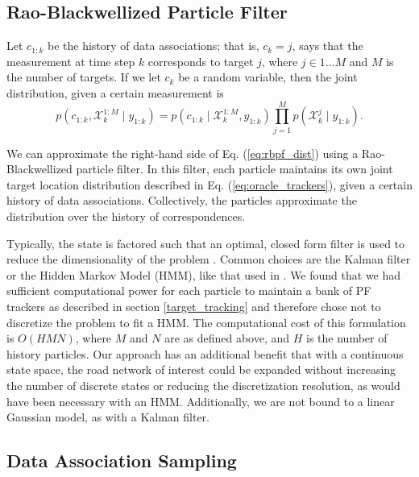\documentclass[letterpaper, 10 pt, conference]{ieeeconf}  %
\begin{document}
\subsection{Rao-Blackwellized Particle Filter}

Let $c_{1:k}$ be the history of data associations; that is, $c_k = j$, says that the measurement at time step $k$ corresponds to target $j$, where $j \in 1 \ldots M$ and $M$ is the number of targets. If we let $c_k$ be a random variable, then the joint distribution, given a certain measurement is
\begin{equation}\label{eq:rbpf_dist}
    p(c_{1:k}, \mathcal{X}^{1:M}_{k} \mid y_{1:k}) = p(c_{1:k} \mid \mathcal{X}^{1:M}_{k}, y_{1:k}) \prod_{j=1}^M p(\mathcal{X}^{j}_{k} \mid y_{1:k}).
\end{equation}

We can approximate the right-hand side of Eq. (\ref{eq:rbpf_dist}) using a Rao-Blackwellized particle filter. In this filter, each particle maintains its own joint target location distribution described in Eq. (\ref{eq:oracle_trackers}), given a certain history of data associations. Collectively, the particles approximate the distribution over the history of correspondences.

Typically, the state is factored such that an optimal, closed form filter is used to reduce the dimensionality of the problem \cite{Doucet2000a}. Common choices are the Kalman filter or the Hidden Markov Model (HMM), like that used in \cite{Ahmed2017}. We found that we had sufficient computational power for each particle to maintain a bank of PF trackers as described in section \ref{target_tracking} and therefore chose not to discretize the problem to fit a HMM. The computational cost of this formulation is $O(HMN)$, where $M$ and $N$ are as defined above, and $H$ is the number of history particles. Our approach has an additional benefit that with a continuous state space, the road network of interest could be expanded without increasing the number of discrete states or reducing the discretization resolution, as would have been necessary with an HMM. Additionally, we are not bound to a linear Gaussian model, as with a Kalman filter.

\subsection{Data Association Sampling}\label{data_association_sampling}
\end{document}
